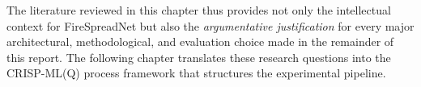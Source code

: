 The literature reviewed in this chapter thus provides not only the intellectual context for FireSpreadNet but also the \emph{argumentative justification} for every major architectural, methodological, and evaluation choice made in the remainder of this report.
The following chapter translates these research questions into the CRISP-ML(Q) process framework that structures the experimental pipeline.
